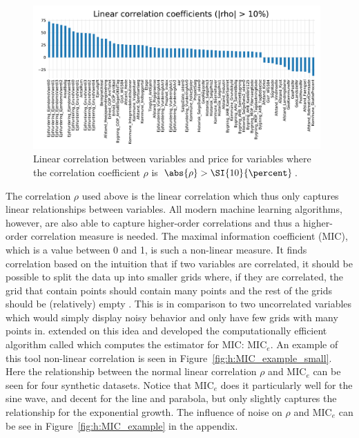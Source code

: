 \begin{figure}
  \centerfloat
  \includegraphics[width=0.98\textwidth, trim=0 0 0 40, clip]{figures/housing/lin_correlation.pdf}
  \caption[Linear correlation between variables and price]
          {Linear correlation between variables and price for variables where the correlation coefficient $\rho$ is $\abs{\rho} > \SI{10}{\percent}$.}
  \label{fig:h:corr_lin}
\end{figure}

The correlation $\rho$ used above is the linear correlation which thus only captures linear relationships between variables. All modern machine learning algorithms, however, are also able to capture higher-order correlations and thus a higher-order correlation measure is needed. The maximal information coefficient (MIC), which is a value between \num{0} and \num{1}, is such a non-linear measure. It finds correlation based on the intuition that if two variables are correlated, it should be possible to split the data up into smaller grids where, if they are correlated, the grid that contain points should contain many points and the rest of the grids should be (relatively) empty \autocite{reshefDetectingNovelAssociations2011}. This is in comparison to two uncorrelated variables which would simply display noisy behavior and only have few grids with many points in. \citet{albanesePracticalToolMaximal2018a} extended on this idea and developed the computationally efficient algorithm called  which computes the estimator for MIC: $\mathrm{MIC}_e$. An example of this tool non-linear correlation is seen in Figure~\ref{fig:h:MIC_example_small}. Here the relationship between the normal linear correlation $\rho$ and $\mathrm{MIC}_e$ can be seen for four synthetic datasets. Notice that $\mathrm{MIC}_e$ does it particularly well for the sine wave, and decent for the line and parabola, but only slightly captures the relationship for the exponential growth. The influence of noise on $\rho$ and $\mathrm{MIC}_e$ can be see in Figure~\ref{fig:h:MIC_example} in the appendix. 

